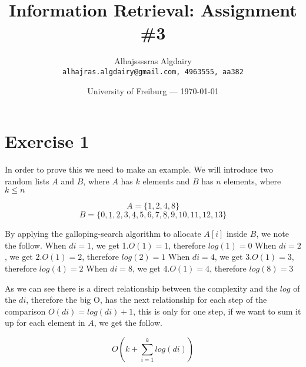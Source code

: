 \documentclass{article}
\title{Information Retrieval: Assignment \#3} %
\author{Alhajssssras Algdairy\\ \texttt{alhajras.algdairy@gmail.com, 4963555, aa382}} %
\date{University of Freiburg --- \today} %
\begin{document}
\maketitle %


\section*{Exercise 1} %

In order to prove this we need to make an example. We will introduce two random lists $A$ and $B$, where $A$ has $k$ elements and $B$ has $n$ elements, where $ k \leq n $

\begin{equation}
	A = \{1, 2, 4, 8\}
\end{equation}
\begin{equation}
	B = \{0, \underline{1}, \underline{2}
	, 3, \underline{4}, 5, 6, 7, \underline{8}, 9, 10, 11, 12, 13\}
\end{equation}

By applying the galloping-search algorithm to allocate $A[i]$ inside $B$, we note the follow.\vspace{2mm} %
\linebreak
When $di = 1$, we get 1.$O(1) = 1$, therefore $log(1) = 0$ \linebreak
When $di = 2$, we get $2.O(1) = 2$, therefore $log(2) = 1$ \linebreak
When $di = 4$, we get $3.O(1) = 3$, therefore $log(4) = 2$ \linebreak
When $di = 8$, we get $4.O(1) = 4$, therefore $log(8) = 3$ \linebreak

As we can see there is a direct relationship between the complexity and the $log$ of the $di$, therefore the big O, has the next relationship for each step of the comparison $O(di) = log(di) + 1$, this is only for one step, if we want to sum it up for each element in $A$, we get the follow. 

\begin{equation}
	O(k + \sum_{i=1}^{k} log(di))
\end{equation}

\clearpage

\end{document}
